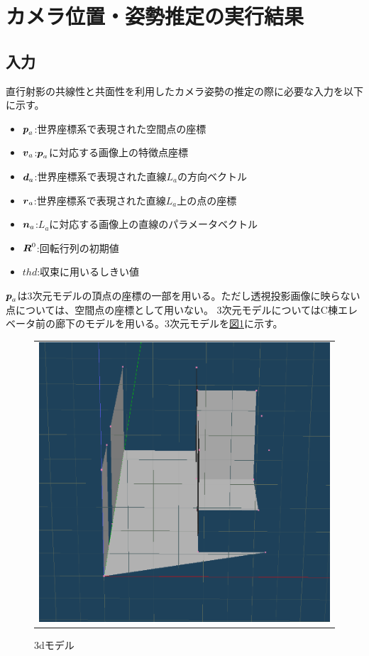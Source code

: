 \documentclass[]{jarticle}          %
\begin{document}
\section{カメラ位置・姿勢推定の実行結果}
\subsection{入力}
直行射影の共線性と共面性を利用したカメラ姿勢の推定の際に必要な入力を以下に示す。
\begin{itemize}
  \item $\mbox{\boldmath $p$}_a$:世界座標系で表現された空間点の座標
  \item $\mbox{\boldmath $v$}_a$:$\mbox{\boldmath $p$}_a$に対応する画像上の特徴点座標
  \item $\mbox{\boldmath $d$}_a$:世界座標系で表現された直線$L_a$の方向ベクトル
  \item $\mbox{\boldmath $r$}_a$:世界座標系で表現された直線$L_a$上の点の座標
  \item $\mbox{\boldmath $n$}_a$:$L_a$に対応する画像上の直線のパラメータベクトル
  \item $\mbox{\boldmath $R$}^0$:回転行列の初期値
  \item $thd$:収束に用いるしきい値
\end{itemize}
$\mbox{\boldmath $p$}_a$は3次元モデルの頂点の座標の一部を用いる。ただし透視投影画像に映らない点については、空間点の座標として用いない。
3次元モデルについてはC棟エレベータ前の廊下のモデルを用いる。3次元モデルを\hyperref[one]{図\ref{one}}に示す。
\begin{figure}[!ht]
  \begin{center}
    \begin{tabular}{c}
      \includegraphics[keepaspectratio, scale=0.3]{figures/3dmodel.png}
    \end{tabular}
  \end{center}
  \caption{3dモデル}
  \label{one}
\end{figure}
\end{document}
